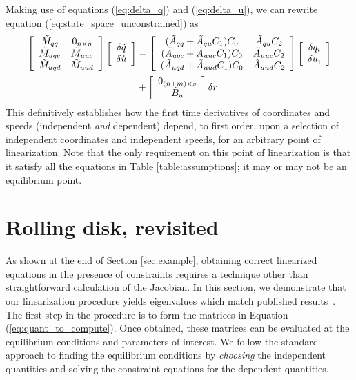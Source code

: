 Making use of equations (\ref{eq:delta_q}) and (\ref{eq:delta_u}), we can
rewrite equation (\ref{eq:state_space_unconstrained}) as
\begin{align}
  \label{eq:state_space_constrained}
  \left[
    \begin{array}{cc}
      \tilde{M}_{qq} & 0_{n \times o} \\
      \tilde{M}_{uqc} & \tilde{M}_{uuc} \\
      \tilde{M}_{uqd} & \tilde{M}_{uud}
    \end{array}
    \right]
    \left[
      \begin{array}{c}
        \delta \dot{q} \\
        \delta \dot{u}
      \end{array}
    \right]
   &=
   \left[
     \begin{array}{cc}
       (\tilde{A}_{qq} + \tilde{A}_{qu} C_1 ) C_0 & \tilde{A}_{qu} C_2 \\
       (\tilde{A}_{uqc} + \tilde{A}_{uuc} C_1 ) C_0 & \tilde{A}_{uuc} C_2\\
       (\tilde{A}_{uqd} + \tilde{A}_{uud} C_1 ) C_0 & \tilde{A}_{uud} C_2
     \end{array}
   \right]
    \left[
      \begin{array}{c}
        \delta q_i \\
        \delta u_i
      \end{array}
    \right]
    \notag \\
    &+\left[
      \begin{array}{c}
        0_{(n+m) \times s} \\
        \tilde{B}_{u}
      \end{array}
    \right]
    \delta r
\end{align}
This definitively establishes how the first time derivatives of coordinates and
speeds (independent \textit{and} dependent) depend, to first order, upon a
selection of independent coordinates and independent speeds, for an arbitrary
point of linearization. Note that the only requirement on this point of
linearization is that it satisfy all the equations in Table
\ref{table:assumptions}; it may or may not be an equilibrium point.

\section{Rolling disk, revisited}
\label{sec:example_revisited}
As shown at the end of Section \ref{sec:example}, obtaining correct linearized
equations in the presence of constraints requires a technique other than
straightforward calculation of the Jacobian. In this section, we demonstrate
that our linearization procedure yields eigenvalues which match published
results~\cite{Schwab2003,Kane1985,Neimark1972}. The first step in the procedure
is to form the matrices in Equation (\ref{eq:quant_to_compute}). Once obtained,
these matrices can be evaluated at the equilibrium conditions and parameters of
interest. We follow the standard approach to finding the equilibrium conditions
by \textit{choosing} the independent quantities and solving the constraint
equations for the dependent quantities.

